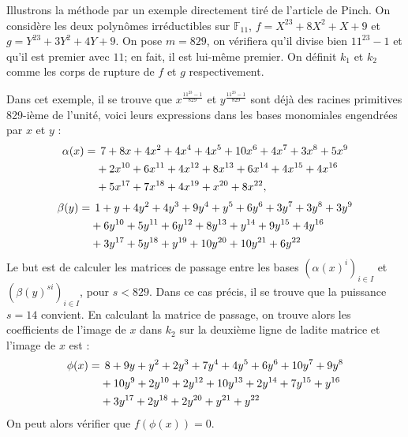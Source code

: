 \documentclass[a4paper]{article} %
\numberwithin{section}{part}
\numberwithin{equation}{section}
\newcommand\GF[1]{\mathbb{F}_{#1}}
\begin{document}
\begin{ex}
Illustrons la méthode par un exemple directement tiré de l'article de 
Pinch\cite{Pin}. On considère les deux polynômes irréductibles sur $\GF{11}$, 
$f = X^{23} + 8X^2 + X + 9$ et $g = Y^{23} + 3Y^2 + 4Y + 9$. On pose $m = 829$, 
on vérifiera qu'il divise bien $11^{23} - 1$ et qu'il est premier avec $11$; 
en fait, il est lui-même premier. On définit $k_1$ et $k_2$ comme les corps de 
rupture de $f$ et $g$ respectivement.\par
Dans cet exemple, il se trouve que $x^{\tfrac{11^{23} - 1}{829}}$ et 
$y^{\tfrac{11^{23} - 1}{829}}$ sont déjà des racines primitives 829-ième de 
l'unité, voici leurs expressions dans les bases monomiales engendrées par $x$ et
$y$ :
\begin{align*}
\alpha(x) =&\hspace{0.15cm} 7 + 8x + 4x^2 + 4x^4 + 4x^5 + 10x^6 + 4x^7 + 3x^8 + 
5x^9\\
& + 2x^{10} + 6x^{11} + 4x^{12} + 8x^{13} + 6x^{14} + 4x^{15} + 4x^{16}\\
& + 5x^{17}  + 7x^{18} + 4x^{19} + x^{20} + 8x^{22},
\end{align*}
\begin{align*}
\beta(y) =&\hspace{0.15cm}1 + y + 4y^2 + 4y^3 + 9y^4 + y^5 + 6y^6 + 3y^7 + 3y^8 
+ 3y^9\\
& + 6y^{10} + 5y^{11} + 6y^{12} + 8y^{13} + y^{14} + 9y^{15} + 4y^{16}\\
& + 3y^{17} + 5y^{18} + y^{19} + 10y^{20} + 10y^{21} + 6y^{22}
\end{align*}
Le but est de calculer les matrices de passage entre les bases
$(\alpha(x)^i)_{i\in I}$ et $(\beta(y)^{si})_{i\in I}$, pour $s < 829$.
Dans ce cas précis, il se trouve que la puissance $s = 14$ convient. En 
calculant la matrice de passage, on trouve alors les coefficients de l'image de 
$x$ dans $k_2$ sur la deuxième ligne de ladite matrice et l'image de $x$ est :
\begin{align*}
\phi(x) =&\hspace{0.15cm} 8 + 9y + y^2 + 2y^3 + 7y^4 + 4y^5 + 6y^6 + 10y^7 + 
9y^8\\
& + 10y^9 + 2y^{10} + 2y^{12} + 10y^{13} + 2y^{14} + 7y^{15} + y^{16}\\
& + 3y^{17} + 2y^{18} + 2y^{20} + y^{21} + y^{22}
\end{align*}
On peut alors vérifier que $f(\phi(x)) = 0$.
\end{ex}
\end{document}
